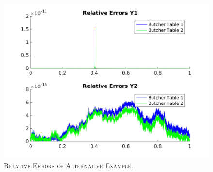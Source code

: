 \documentclass[a4paper,oneside]{book}
\numberwithin{equation}{chapter}
\begin{document}
\begin{figure}[H]
\centering
\includegraphics[scale=0.09]{3re}
\caption{\textsc{Relative Errors of Alternative Example.}}
\end{figure}
\end{document}
